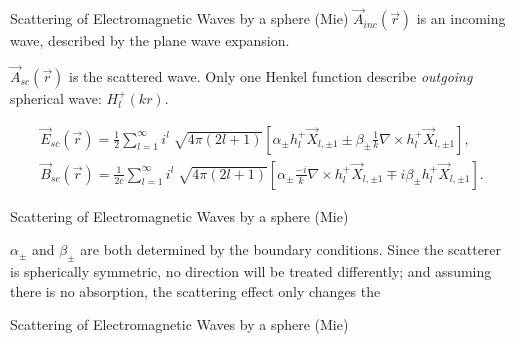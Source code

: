 \documentclass[10pt]{beamer}
\begin{document}

\begin{frame}[fragile]{Scattering of Electromagnetic Waves by a sphere (Mie)}
$\vec{A}_{inc}(\vec{r})$ is an incoming wave, described by the plane wave expansion.

$\vec{A}_{sc}(\vec{r})$ is the scattered wave. Only one Henkel function describe \emph{outgoing} spherical wave: $H_l^+(kr)$.

      \begin{equation*}
      \begin{split}
          \vec{E}_{sc}(\vec{r})=\frac{1}{2}\sum_{l=1}^{\infty}i^l\sqrt[]{4\pi(2l+1)}\left[\alpha _{\pm}h^+_l\vec{X}_{l,\pm1} \pm \beta_{\pm}\frac{1}{k}\nabla \times h^+_l\vec{X}_{l,\pm1}\right],\\
          \vec{B}_{sc}(\vec{r})=\frac{1}{2c}\sum_{l=1}^{\infty}i^l\sqrt[]{4\pi(2l+1)}\left[\alpha_{\pm}\frac{-i}{k}\nabla \times h^+_l\vec{X}_{l,\pm1} \mp i\beta_{\pm}h^+_l\vec{X}_{l,\pm1}\right].     
          \end{split}
      \end{equation*}

\end{frame}


\begin{frame}[fragile]{Scattering of Electromagnetic Waves by a sphere (Mie)}

$\alpha _{\pm}$ and $\beta_{\pm}$ are both determined by the boundary conditions.
Since the scatterer is spherically symmetric, no direction will be treated differently; and assuming there is no absorption, the scattering effect only changes the 

\end{frame}


\begin{frame}[fragile]{Scattering of Electromagnetic Waves by a sphere (Mie)}


\end{frame}

\end{document}
